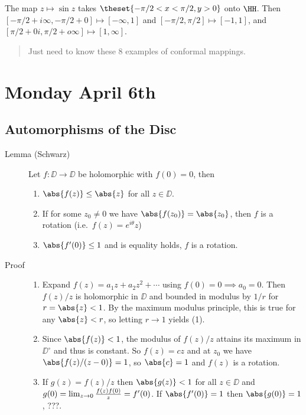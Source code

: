 The map \(z\mapsto \sin z\) takes \(\theset{-\pi/2 < x < \pi/2, y>0}\)
onto \(\HH\). Then
\([-\pi/2 + i\infty, -\pi/2 + 0] \mapsto [-\infty, 1]\) and
\([-\pi/2, \pi/2] \mapsto [-1, 1]\), and
\([\pi/2 + 0i, \pi/2 + o\infty] \mapsto [1, \infty]\).

\begin{quote}
Just need to know these 8 examples of conformal mappings.
\end{quote}

\hypertarget{monday-april-6th}{%
\section{Monday April 6th}\label{monday-april-6th}}

\hypertarget{automorphisms-of-the-disc}{%
\subsection{Automorphisms of the Disc}\label{automorphisms-of-the-disc}}

\begin{description}
\item[Lemma (Schwarz)]
Let \(f: \DD \to \DD\) be holomorphic with \(f(0) = 0\), then

\begin{enumerate}
\def\labelenumi{\arabic{enumi}.}
\tightlist
\item
  \(\abs{f(z)} \leq \abs{z}\) for all \(z\in \DD\).
\item
  If for some \(z_0 \neq 0\) we have \(\abs{f(z_0)} = \abs{z_0}\), then
  \(f\) is a rotation (i.e.~\(f(z) = e^{i\theta}z\))
\item
  \(\abs{f'(0)} \leq 1\) and is equality holds, \(f\) is a rotation.
\end{enumerate}
\item[Proof]
\hfill

\begin{enumerate}
\def\labelenumi{\arabic{enumi}.}
\item
  Expand \(f(z) = a_1 z + a_2 z^2 + \cdots\) using
  \(f(0) = 0 \implies a_0 = 0\). Then \(f(z)/z\) is holomorphic in
  \(\DD\) and bounded in modulus by \(1/r\) for \(r = \abs{z} < 1\). By
  the maximum modulus principle, this is true for any \(\abs{z} < r\),
  so letting \(r\to 1\) yields (1).
\item
  Since \(\abs{f(z)} < 1\), the modulus of \(f(z)/z\) attains its
  maximum in \(\DD^\circ\) and thus is constant. So \(f(z) = cz\) and at
  \(z_0\) we have \(\abs{f(z) / (z-0)} = 1\), so \(\abs{c} = 1\) and
  \(f(z)\) is a rotation.
\item
  If \(g(z) = f(z)/z\) then \(\abs{g(z)} < 1\) for all \(z\in \DD\) and
  \(g(0) = \lim_{z\to 0} {f(z) f(0) \over z} = f'(0)\). If
  \(\abs{f'(0)} = 1\) then \(\abs{g(0)} =1\), ???.
\end{enumerate}
\end{description}

